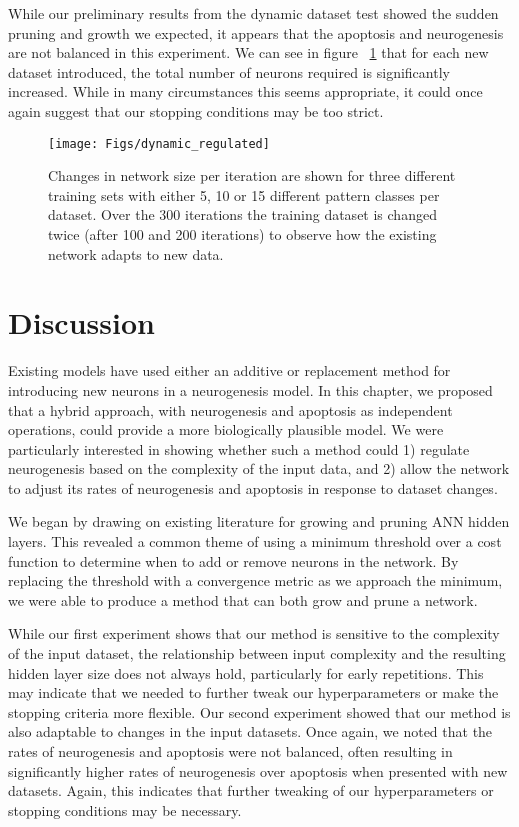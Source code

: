 While our preliminary results from the dynamic dataset test showed the 
sudden pruning and growth we expected, it appears that the 
apoptosis and neurogenesis are not balanced in this experiment. 
We can see in figure ~\ref{fig:dynamic_regulated} that for each new dataset introduced, 
the total number of neurons required is significantly increased. 
While in many circumstances 
this seems appropriate, it could once again suggest that our 
stopping conditions may be too strict. 

\begin{figure}[!h]
\begin{center}
\texttt{[image: Figs/dynamic\_regulated]}
\end{center}
\caption{ 
Changes in network size per iteration are shown for three 
different training sets with either 5, 10 or 15 different pattern classes 
per dataset. Over the 300 iterations the training dataset is changed 
twice (after 100 and 200 iterations) to observe how the existing network adapts 
to new data.}
\label{fig:dynamic_regulated}
\end{figure}

\section{Discussion}

Existing models have used either an additive or replacement method for introducing new 
neurons in a neurogenesis model. 
In this chapter, we proposed that a 
hybrid approach, with neurogenesis and apoptosis as 
independent operations, could provide a more biologically plausible model. 
We were particularly interested in showing whether such a method could  
1) regulate neurogenesis based on the complexity of the input data, and 
2) allow the network to adjust its rates of neurogenesis and apoptosis in response to 
dataset changes.

We began by drawing on existing literature for growing and pruning \ac{ANN} 
hidden layers. 
This revealed a common theme of using a minimum threshold 
over a cost function to determine when to add or remove neurons in the network. 
By replacing the threshold with a convergence metric 
as we approach the minimum, we were able to produce a method that can 
both grow and prune a network.

While our first experiment shows that our method is sensitive to the complexity of the input 
dataset, the relationship between input complexity and the resulting hidden 
layer size does not always hold, particularly for early repetitions. 
This may indicate that we needed 
to further tweak our hyperparameters or make the stopping criteria more flexible. 
Our second experiment showed that our method is also adaptable 
to changes in the input datasets. 
Once again, we noted that the rates of neurogenesis 
and apoptosis were not balanced, often resulting in significantly higher rates 
of neurogenesis over apoptosis when presented with new datasets. 
Again, this indicates that further tweaking of our hyperparameters or 
stopping conditions may be necessary.

